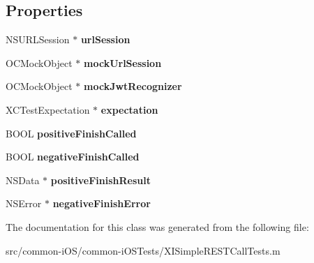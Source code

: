 \subsection*{Properties}
\begin{DoxyCompactItemize}
\item 
\hypertarget{interface_x_i_simple_r_e_s_t_call_tests_a8e41651e138f5d63cc80fe8ed09eadde}{}\label{interface_x_i_simple_r_e_s_t_call_tests_a8e41651e138f5d63cc80fe8ed09eadde} 
N\+S\+U\+R\+L\+Session $\ast$ {\bfseries url\+Session}
\item 
\hypertarget{interface_x_i_simple_r_e_s_t_call_tests_a81dc67836149b8943257e5b8fcced873}{}\label{interface_x_i_simple_r_e_s_t_call_tests_a81dc67836149b8943257e5b8fcced873} 
O\+C\+Mock\+Object $\ast$ {\bfseries mock\+Url\+Session}
\item 
\hypertarget{interface_x_i_simple_r_e_s_t_call_tests_aed38fb92c3575ac2a2f5568b9ec553b0}{}\label{interface_x_i_simple_r_e_s_t_call_tests_aed38fb92c3575ac2a2f5568b9ec553b0} 
O\+C\+Mock\+Object $\ast$ {\bfseries mock\+Jwt\+Recognizer}
\item 
\hypertarget{interface_x_i_simple_r_e_s_t_call_tests_aeb6ebe176e780e6bd33efa70f524cf21}{}\label{interface_x_i_simple_r_e_s_t_call_tests_aeb6ebe176e780e6bd33efa70f524cf21} 
X\+C\+Test\+Expectation $\ast$ {\bfseries expectation}
\item 
\hypertarget{interface_x_i_simple_r_e_s_t_call_tests_ab5c4dfe125448b53c68fe1d9df54b252}{}\label{interface_x_i_simple_r_e_s_t_call_tests_ab5c4dfe125448b53c68fe1d9df54b252} 
B\+O\+OL {\bfseries positive\+Finish\+Called}
\item 
\hypertarget{interface_x_i_simple_r_e_s_t_call_tests_a8643e4bb3778ec3d29526d4021153792}{}\label{interface_x_i_simple_r_e_s_t_call_tests_a8643e4bb3778ec3d29526d4021153792} 
B\+O\+OL {\bfseries negative\+Finish\+Called}
\item 
\hypertarget{interface_x_i_simple_r_e_s_t_call_tests_ad63873249a0e50de8dca1c53cc373020}{}\label{interface_x_i_simple_r_e_s_t_call_tests_ad63873249a0e50de8dca1c53cc373020} 
N\+S\+Data $\ast$ {\bfseries positive\+Finish\+Result}
\item 
\hypertarget{interface_x_i_simple_r_e_s_t_call_tests_a490f7b7c11c14fca22b82ce818621205}{}\label{interface_x_i_simple_r_e_s_t_call_tests_a490f7b7c11c14fca22b82ce818621205} 
N\+S\+Error $\ast$ {\bfseries negative\+Finish\+Error}
\end{DoxyCompactItemize}


The documentation for this class was generated from the following file\+:\begin{DoxyCompactItemize}
\item 
src/common-\/i\+O\+S/common-\/i\+O\+S\+Tests/X\+I\+Simple\+R\+E\+S\+T\+Call\+Tests.\+m\end{DoxyCompactItemize}
